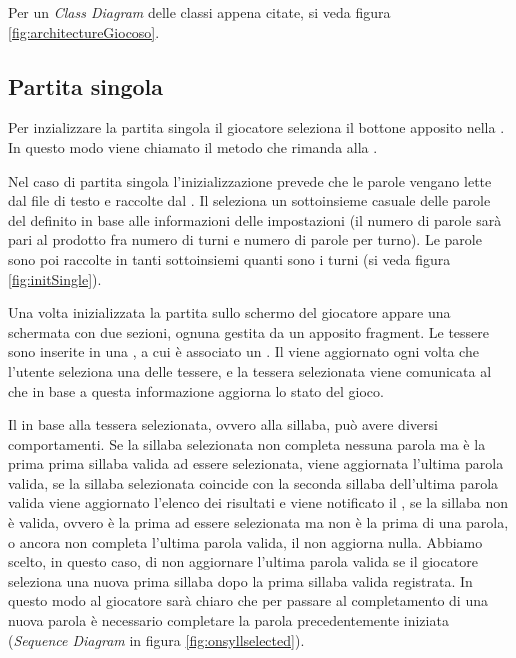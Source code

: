 Per un \textit{Class Diagram} delle classi appena citate, si veda figura \ref{fig:architectureGiocoso}.


\subsection{Partita singola}
Per inzializzare la partita singola il giocatore seleziona il bottone apposito nella . In questo modo viene chiamato il metodo  che rimanda alla .

Nel caso di partita singola l'inizializzazione prevede che le parole vengano lette dal file di testo e raccolte dal . Il  seleziona un sottoinsieme casuale delle parole del  definito in base alle informazioni delle impostazioni (il numero di parole sarà pari al prodotto fra numero di turni e numero di parole per turno). Le parole sono poi raccolte in tanti sottoinsiemi quanti sono i turni (si veda figura \ref{fig:initSingle}).


Una volta inizializzata la partita sullo schermo del giocatore appare una schermata con due sezioni, ognuna gestita da un apposito fragment. Le tessere sono inserite in una , a cui è associato un . Il  viene aggiornato ogni volta che l'utente seleziona una delle tessere, e la tessera selezionata viene comunicata al  che in base a questa informazione aggiorna lo stato del gioco.

Il  in base alla tessera selezionata, ovvero alla sillaba, può avere diversi comportamenti. Se la sillaba selezionata non completa nessuna parola ma è la prima prima sillaba valida ad essere selezionata, viene aggiornata l'ultima parola valida, se la sillaba selezionata coincide con la seconda sillaba dell'ultima parola valida viene aggiornato l'elenco dei risultati e viene notificato il , se la sillaba non è valida, ovvero è la prima ad essere selezionata ma non è la prima di una parola, o ancora non completa l'ultima parola valida, il  non aggiorna nulla. Abbiamo scelto, in questo caso, di non aggiornare l'ultima parola valida se il giocatore seleziona una nuova prima sillaba dopo la prima sillaba valida registrata. In questo modo al giocatore sarà chiaro che per passare al completamento di una nuova parola è necessario completare la parola precedentemente iniziata (\textit{Sequence Diagram} in figura \ref{fig:onsyllselected}).

